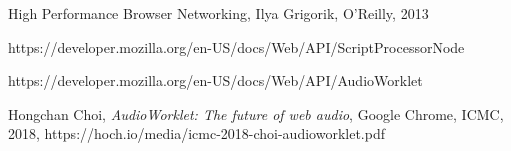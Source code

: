 \documentclass[11pt, a4paper, twoside]{article}
\begin{document}
\begin{thebibliography}{9}

  High Performance Browser Networking,
  Ilya Grigorik,
  O'Reilly,
  2013
  
  https://developer.mozilla.org/en-US/docs/Web/API/ScriptProcessorNode

https://developer.mozilla.org/en-US/docs/Web/API/AudioWorklet

  Hongchan Choi,
    \textit{AudioWorklet: The future of web audio},
    Google Chrome,
    ICMC,
    2018,
    https://hoch.io/media/icmc-2018-choi-audioworklet.pdf

\end{thebibliography}
\end{document}
